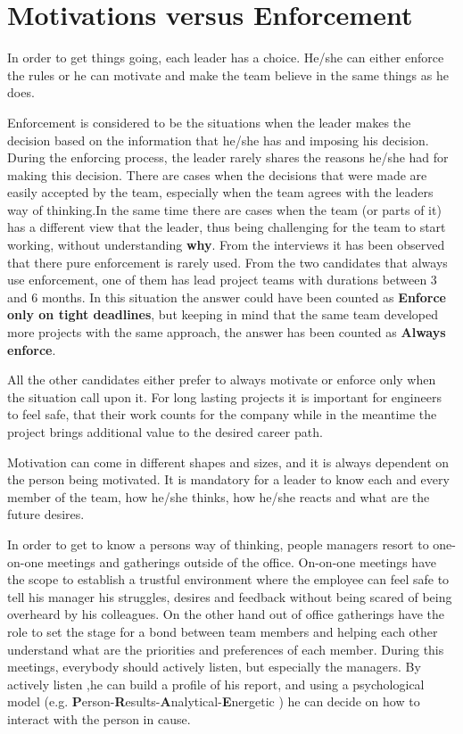 \chapter{Motivations versus Enforcement}
\label{chapter:motivation}

In order to get things going, each leader has a choice. He/she can either enforce the rules or he can motivate and make the team believe in the same things as he does.

Enforcement is considered to be the situations when the leader makes the decision based on the information that he/she has and imposing his decision. During the enforcing process, the leader rarely shares the reasons he/she had for making this decision. There are cases when the decisions that were made are easily accepted by the team, especially when the team agrees with the leaders way of thinking.In the same time there are cases when the team (or parts of it) has a different view that the leader, thus being challenging for the team to start working, without understanding \textbf{why}.
From the interviews  it has been observed that there pure enforcement is rarely used. 
From the two candidates that always use enforcement, one of them has lead project teams with durations between 3 and 6 months. In this situation the answer could have been counted as \textbf{Enforce only on tight deadlines}, but keeping in mind that the same team developed more projects with the same approach, the answer has been counted as \textbf{Always enforce}.


All the other candidates either prefer to always motivate or enforce only when the situation call upon it. For long lasting projects it is important for engineers to feel safe, that their work counts for the company while in the meantime the project brings additional value to the desired career path.

Motivation can come in different shapes and sizes, and it is always dependent on the person being motivated. It is mandatory for a leader to know each and every member of the team, how he/she thinks, how he/she reacts and what are the future desires. 

In order to get to know a persons way of thinking, people managers resort to one-on-one meetings and gatherings outside of the office. On-on-one meetings have the scope to establish a trustful environment where the employee can feel safe to tell his manager his struggles, desires and feedback without being scared of  being overheard by his colleagues. On the other hand out of office gatherings have the role to set the stage for a bond between team members and helping each other understand what are the priorities and preferences of each member. During this meetings, everybody should actively listen, but especially the managers. By actively listen ,he can build a profile of his report, and using a psychological model (e.g. \textbf{P}erson-\textbf{R}esults-\textbf{A}nalytical-\textbf{E}nergetic \cite{abur-pm}) he can decide on how to interact with the person in cause.

